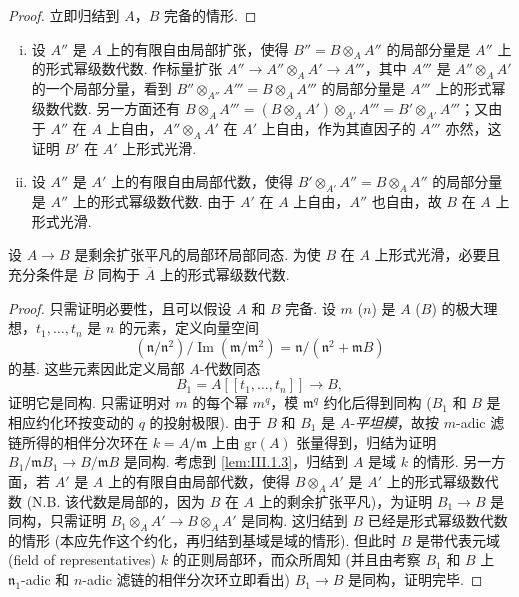\begin{proof}
立即归结到 $A$，$B$ 完备的情形.
\end{proof}

\begin{enumerate}[(i)]
\item 设 $A''$ 是 $A$ 上的有限自由局部扩张，使得 $B'' = B \otimes_A A''$ 的局部分量是 $A''$ 上的形式幂级数代数. 作标量扩张 $A'' \to A'' \otimes_A A' \to A'''$，其中 $A'''$ 是 $A'' \otimes_A A'$ 的一个局部分量，看到 $B'' \otimes_{A''} A''' = B \otimes_A A'''$ 的局部分量是 $A'''$ 上的形式幂级数代数. 另一方面还有 $B \otimes_A A''' = (B \otimes_A A') \otimes_{A'} A''' = B' \otimes_{A'} A'''$；又由于 $A''$ 在 $A$ 上自由，$A'' \otimes_A A'$ 在 $A'$ 上自由，作为其直因子的 $A'''$ 亦然，这证明 $B'$ 在 $A'$ 上形式光滑.
\item 设 $A''$ 是 $A'$ 上的有限自由局部代数，使得 $B' \otimes_{A'} A'' = B \otimes_A A''$ 的局部分量是 $A''$ 上的形式幂级数代数. 由于 $A'$ 在 $A$ 上自由，$A''$ 也自由，故 $B$ 在 $A$ 上形式光滑.
\end{enumerate}

\begin{proposition}\label{prop:III.1.5}
设 $A \to B$ 是剩余扩张平凡的局部环局部同态. 为使 $B$ 在 $A$ 上形式光滑，必要且充分条件是 $\overline{B}$ 同构于 $\overline{A}$ 上的形式幂级数代数.
\end{proposition}

\begin{proof}
只需证明必要性，且可以假设 $A$ 和 $B$ 完备. 设 $m$ ($n$) 是 $A$ ($B$) 的极大理想，$t_1, \dots, t_n$ 是 $n$ 的元素，定义向量空间
\[
(\mathfrak{n}/\mathfrak{n}^2)/\operatorname{Im}(\mathfrak{m}/\mathfrak{m}^2) = \mathfrak{n}/(\mathfrak{n}^2 + \mathfrak{m}B)
\]
的基. 这些元素因此定义局部 $A$-代数同态
\[
B_1 = A[\![t_1, \dots, t_n]\!] \longrightarrow B,
\]
证明它是同构. 只需证明对 $m$ 的每个幂 $m^q$，模 $\mathfrak{m}^q$ 约化后得到同构 ($B_1$ 和 $B$ 是相应约化环按变动的 $q$ 的投射极限). 由于 $B$ 和 $B_1$ 是 $A$-\emph{平坦模}，故按 $m$-adic 滤链所得的相伴分次环在 $k = A/\mathfrak{m}$ 上由 $\mathrm{gr}(A)$ 张量得到，归结为证明 $B_1/\mathfrak{m}B_1 \to B/\mathfrak{m}B$ 是同构. 考虑到 \ref{lem:III.1.3}，归结到 $A$ 是域 $k$ 的情形. 另一方面，若 $A'$ 是 $A$ 上的有限自由局部代数，使得 $B \otimes_A A'$ 是 $A'$ 上的形式幂级数代数 (N.B. 该代数是局部的，因为 $B$ 在 $A$ 上的剩余扩张平凡)，为证明 $B_1 \to B$ 是同构，只需证明 $B_1 \otimes_A A' \to B \otimes_A A'$ 是同构. 这归结到 $B$ 已经是形式幂级数代数的情形 (本应先作这个约化，再归结到基域是域的情形). 但此时 $B$ 是带代表元域 (field of representatives) $k$ 的正则局部环，而众所周知 (并且由考察 $B_1$ 和 $B$ 上 $\mathfrak{n}_1$-adic 和 $n$-adic 滤链的相伴分次环立即看出) $B_1 \to B$ 是同构，证明完毕.
\end{proof}

